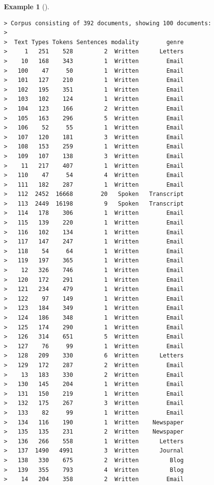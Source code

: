\documentclass[
  letterpaper,
  DIV=11,
  numbers=noendperiod]{scrreport}
\theoremstyle{definition}
\newtheorem{example}{Example}[chapter]
\theoremstyle{remark}
\begin{document}
\begin{example}[]
\begin{verbatim}
> Corpus consisting of 392 documents, showing 100 documents:
> 
>  Text Types Tokens Sentences modality        genre
>     1   251    528         2  Written      Letters
>    10   168    343         1  Written        Email
>   100    47     50         1  Written        Email
>   101   127    210         1  Written        Email
>   102   195    351         1  Written        Email
>   103   102    124         1  Written        Email
>   104   123    166         2  Written        Email
>   105   163    296         5  Written        Email
>   106    52     55         1  Written        Email
>   107   120    181         3  Written        Email
>   108   153    259         1  Written        Email
>   109   107    138         3  Written        Email
>    11   217    407         1  Written        Email
>   110    47     54         4  Written        Email
>   111   182    287         1  Written        Email
>   112  2452  16668        20   Spoken   Transcript
>   113  2449  16198         9   Spoken   Transcript
>   114   178    306         1  Written        Email
>   115   139    220         1  Written        Email
>   116   102    134         1  Written        Email
>   117   147    247         1  Written        Email
>   118    54     64         1  Written        Email
>   119   197    365         1  Written        Email
>    12   326    746         1  Written        Email
>   120   172    291         1  Written        Email
>   121   234    479         1  Written        Email
>   122    97    149         1  Written        Email
>   123   184    349         1  Written        Email
>   124   186    348         1  Written        Email
>   125   174    290         1  Written        Email
>   126   314    651         5  Written        Email
>   127    76     99         1  Written        Email
>   128   209    330         6  Written      Letters
>   129   172    287         2  Written        Email
>    13   183    330         2  Written        Email
>   130   145    204         1  Written        Email
>   131   150    219         1  Written        Email
>   132   175    267         3  Written        Email
>   133    82     99         1  Written        Email
>   134   116    190         1  Written    Newspaper
>   135   135    231         2  Written    Newspaper
>   136   266    558         1  Written      Letters
>   137  1490   4991         3  Written      Journal
>   138   330    675         2  Written         Blog
>   139   355    793         4  Written         Blog
>    14   204    358         2  Written        Email

\end{verbatim}
\end{example}
\end{document}

